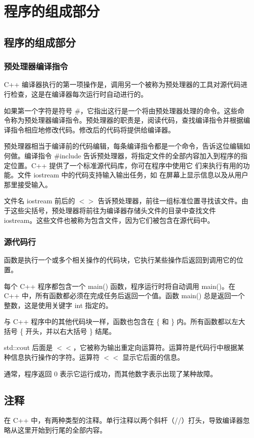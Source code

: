 \chapter{程序的组成部分}
\section{程序的组成部分}
\subsection*{预处理器编译指令}
C++ 编译器执行的第一项操作是，调用另一个被称为预处理器的工具对源代码进行检查，这是在编译器每次运行时自动进行的。

如果第一个字符是符号 \#，它指出这行是一个将由预处理器处理的命令。这些命令称为预处理器编译指令。预处理器的职责是，阅读代码，查找编译指令并根据编译指令相应地修改代码。修改后的代码将提供给编译器。

预处理器相当于编译前的代码编辑，每条编译指令都是一个命令，告诉这位编辑如何做。编译指令 \#include 告诉预处理器，将指定文件的全部内容加入到程序的指定位置。C++ 提供了一个标准源代码库，你可在程序中使用它
们来执行有用的功能。文件 iostream 中的代码支持输入输出任务，如
在屏幕上显示信息以及从用户那里接受输入。

文件名 iostream 前后的 $<>$ 告诉预处理器，前往一组标准位置寻找该文件。由于这些尖括号，预处理器将前往为编译器存储头文件的目录中查找文件 iostream。这些文件也被称为包含文件，因为它们被包含在源代码中。
\subsection*{源代码行}
函数是执行一个或多个相关操作的代码块，它执行某些操作后返回到调用它的位置。

每个 C++ 程序都包含一个 main() 函数，程序运行时将自动调用 main()。在 C++ 中，所有函数都必须在完成任务后返回一个值。函数 main() 总是返回一个整数，这是使用关键字 int 指定的。

与 C++ 程序中的其他代码块一样，函数也包含在 \{ 和 \} 内。所有函数都以左大括号 \{ 开头，并以右大括号 \} 结尾。

std::cout 后面是 $<<$，它被称为输出重定向运算符。运算符是代码行中根据某种信息执行操作的字符。运算符 $<<$ 显示它后面的信息。

通常，程序返回 0 表示它运行成功，而其他数字表示出现了某种故障。
\section{注释}
在 C++ 中，有两种类型的注释。单行注释以两个斜杆（//）打头，导致编译器忽略从这里开始到行尾的全部内容。

